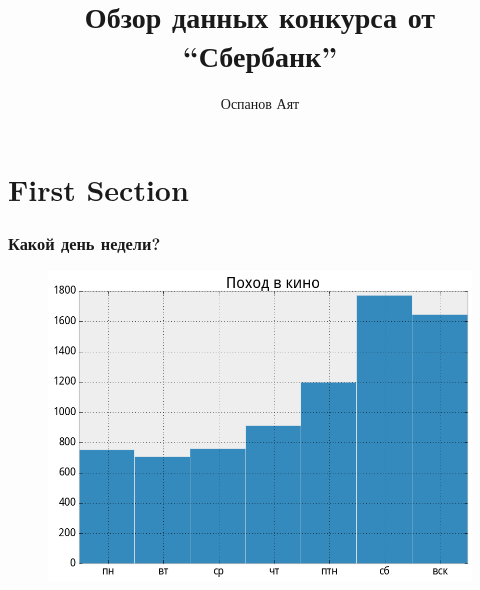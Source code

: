 \documentclass{beamer}
\title[SDSJ]{Обзор данных конкурса от ``Сбербанк''} %
\author{Оспанов Аят} %
\institute[] %
{
517 группа \\ %
}
\date{} %
\begin{document}
\begin{frame}
\titlepage %
\end{frame}



\section{First Section} %


\begin{frame}
\frametitle{Какой день недели?}

\begin{figure}
    \includegraphics[height=0.5\linewidth]{pics/day_of_week.png}
\end{figure}


\end{frame}
\end{document}

